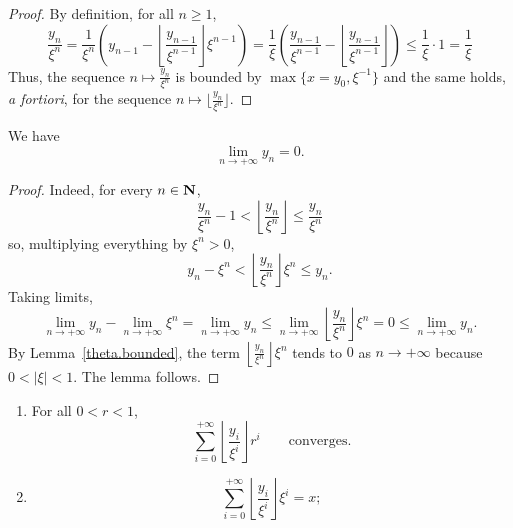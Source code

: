 \begin{proof}
	By definition, for all $n\geq 1$,
	\[
		\frac{y_n}{\xi^n} = \frac{1}{\xi^n} \left(y_{n-1} - \left\lfloor \frac{y_{n-1}}{\xi^{n-1}} \right\rfloor \xi^{n-1}\right)
    = \frac{1}{\xi} \left(\frac{y_{n-1}}{\xi^{n-1}} - \left\lfloor \frac{y_{n-1}}{\xi^{n-1}} \right\rfloor\right)
    \le \frac{1}{\xi}\cdot 1
    = \frac{1}{\xi}
  \]
  Thus, the sequence $n\mapsto \frac{y_n}{\xi^n}$ is bounded by $\max\{x=y_0,\xi^{-1}\}$
  and the same holds, \emph{a fortiori}, for the sequence $n\mapsto \lfloor\frac{y_n}{\xi^n}\rfloor$. 
\end{proof}

\begin{lemma}
  \label{theta.limit_y}
  \leanok
  We have
  \[
    \lim_{n\to+\infty} y_n =0.
  \]
\end{lemma}

\begin{proof}
  \leanok
  Indeed, for every $n\in \mathbf{N}$,
  \[
    \frac{y_n}{\xi^n} - 1 <\left\lfloor{\frac{y_n}{\xi^n}}\right\rfloor \le \frac{y_n}{\xi^n}
  \]
  so, multiplying everything by $\xi^n > 0$,
  \[
    y_n - \xi^n <\left\lfloor{\frac{y_n}{\xi^n}}\right\rfloor\xi^n \le y_n.
  \]
  Taking limits,
  \[
    \lim_{n\to+\infty} y_n - \lim_{n\to+\infty} \xi^n
    = \lim_{n\to+\infty} y_n
    \le \lim_{n\to+\infty} \left\lfloor \frac{y_n}{\xi^n} \right\rfloor \xi^n
    = 0\le\lim_{n\to+\infty} y_n.
  \]
  By Lemma~\ref{theta.bounded},
  the term $\left\lfloor\frac{y_n}{\xi^n}\right\rfloor\xi^n$
  tends to $0$ as $n\to +\infty$ because $0<\lvert \xi\rvert< 1$.
  The lemma follows.
\end{proof}

\begin{proposition}
  \label{theta.has_sum_x}
  \leanok
  \begin{enumerate}
    \item For all $0<r <1$,
      \[
        \sum_{i=0}^{+\infty} \left\lfloor\frac{y_i}{\xi^i}\right\rfloor r^i \qquad\text{converges}.
      \]
    \item
      \[
        \sum_{i=0}^{+\infty} \left\lfloor\frac{y_i}{\xi^i}\right\rfloor\xi^i = x;
      \]
  \end{enumerate}
\end{proposition}

